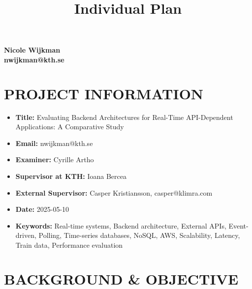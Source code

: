 \documentclass[11pt]{article}
\title{Individual Plan}
\author{}
\date{}
\begin{document}
\maketitle



\noindent\textbf{Nicole Wijkman\\nwijkman@kth.se}

\vspace{1em}
\section*{PROJECT INFORMATION}

\begin{itemize}[leftmargin=*, label={}]
  \item \textbf{Title:} Evaluating Backend Architectures for Real-Time API-Dependent Applications: A Comparative Study
  \item \textbf{Email:} nwijkman@kth.se
  \item \textbf{Examiner:} Cyrille Artho
  \item \textbf{Supervisor at KTH:} Ioana Bercea
  \item \textbf{External Supervisor:} Casper Kristiansson, casper@klimra.com
  \item \textbf{Date:} 2025-05-10
  \item \textbf{Keywords:} Real-time systems, Backend architecture, External APIs, Event-driven, Polling, Time-series databases, NoSQL, AWS, Scalability, Latency, Train data, Performance evaluation
\end{itemize}

\section*{BACKGROUND \& OBJECTIVE}
\end{document}
